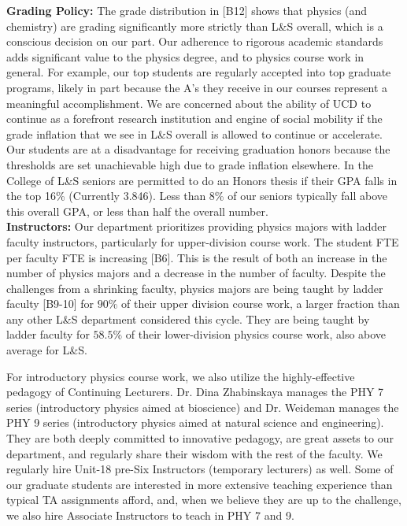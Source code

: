 \documentclass[12pt]{article}
\begin{document}
\noindent
{\bf Grading Policy:} The grade distribution in [B12] shows that
physics (and chemistry) are grading significantly more strictly than
L\&S overall, which is a conscious decision on our part.  Our
adherence to rigorous academic standards adds significant value to the
physics degree, and to physics course work in general.  For example,
our top students are regularly accepted into top graduate programs,
likely in part because the A's they receive in our courses represent a
meaningful accomplishment.  We are concerned about the ability of UCD
to continue as a forefront research institution and engine of social
mobility if the grade inflation that we see in L\&S overall is allowed
to continue or accelerate.  Our students are at a disadvantage for
receiving graduation honors because the thresholds are set
unachievable high due to grade inflation elsewhere.  In the College of
L\&S seniors are permitted to do an Honors thesis if their GPA falls
in the top 16\% (Currently 3.846).  Less than 8\% of our seniors
typically fall above this overall GPA, or less than half the overall
number.\\[3pt]

\noindent
{\bf Instructors:} Our department prioritizes providing physics majors
with ladder faculty instructors, particularly for upper-division
course work.  The student FTE per faculty FTE is increasing [B6].
This is the result of both an increase in the number of physics majors
and a decrease in the number of faculty.  Despite the challenges from
a shrinking faculty, physics majors are being taught by ladder faculty
[B9-10] for $90\%$ of their upper division course work, a larger
fraction than any other L\&S department considered this cycle.  They
are being taught by ladder faculty for $58.5\%$ of their
lower-division physics course work, also above average for L\&S.

For introductory physics course work, we also utilize the
highly-effective pedagogy of Continuing Lecturers.  Dr. Dina
Zhabinskaya manages the PHY 7 series (introductory physics aimed at
bioscience) and Dr. Weideman manages the PHY 9 series (introductory
physics aimed at natural science and engineering).  They are both
deeply committed to innovative pedagogy, are great assets to our
department, and regularly share their wisdom with the rest of the
faculty.  We regularly hire Unit-18 pre-Six Instructors (temporary
lecturers) as well.  Some of our graduate students are interested in
more extensive teaching experience than typical TA assignments afford,
and, when we believe they are up to the challenge, we also hire
Associate Instructors to teach in PHY 7 and 9.\\[3pt]
\end{document}
